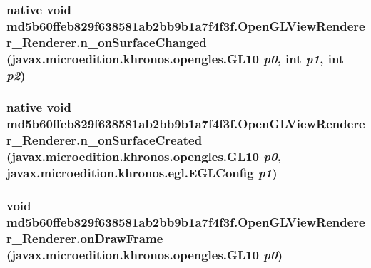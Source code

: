 \hypertarget{classmd5b60ffeb829f638581ab2bb9b1a7f4f3f_1_1_open_g_l_view_renderer___renderer_b404219aa1e0f1148bdd25b396a3786a}{
\subsubsection[{n\_\-onSurfaceChanged}]{\setlength{\rightskip}{0pt plus 5cm}native void md5b60ffeb829f638581ab2bb9b1a7f4f3f.OpenGLViewRenderer\_\-Renderer.n\_\-onSurfaceChanged (javax.microedition.khronos.opengles.GL10 {\em p0}, \/  int {\em p1}, \/  int {\em p2})}}
\label{classmd5b60ffeb829f638581ab2bb9b1a7f4f3f_1_1_open_g_l_view_renderer___renderer_b404219aa1e0f1148bdd25b396a3786a}


\hypertarget{classmd5b60ffeb829f638581ab2bb9b1a7f4f3f_1_1_open_g_l_view_renderer___renderer_87979e2a4ae2dc823ee0edb8db6bf71a}{
\subsubsection[{n\_\-onSurfaceCreated}]{\setlength{\rightskip}{0pt plus 5cm}native void md5b60ffeb829f638581ab2bb9b1a7f4f3f.OpenGLViewRenderer\_\-Renderer.n\_\-onSurfaceCreated (javax.microedition.khronos.opengles.GL10 {\em p0}, \/  javax.microedition.khronos.egl.EGLConfig {\em p1})}}
\label{classmd5b60ffeb829f638581ab2bb9b1a7f4f3f_1_1_open_g_l_view_renderer___renderer_87979e2a4ae2dc823ee0edb8db6bf71a}


\hypertarget{classmd5b60ffeb829f638581ab2bb9b1a7f4f3f_1_1_open_g_l_view_renderer___renderer_13437d07738622115709479669ef46a0}{
\subsubsection[{onDrawFrame}]{\setlength{\rightskip}{0pt plus 5cm}void md5b60ffeb829f638581ab2bb9b1a7f4f3f.OpenGLViewRenderer\_\-Renderer.onDrawFrame (javax.microedition.khronos.opengles.GL10 {\em p0})}}
\label{classmd5b60ffeb829f638581ab2bb9b1a7f4f3f_1_1_open_g_l_view_renderer___renderer_13437d07738622115709479669ef46a0}


